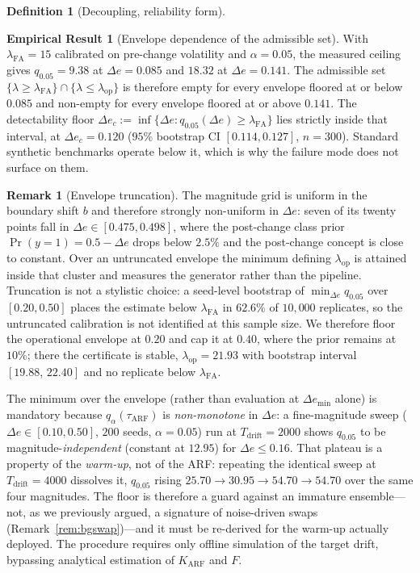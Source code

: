 \documentclass[10pt,conference]{IEEEtran}
\theoremstyle{definition}
\newtheorem{definition}[theorem]{Definition}
\newtheorem{remark}[theorem]{Remark}
\newtheorem{empresult}{Empirical Result}
\newcommand{\LambdaFA}{15}                   %
\newcommand{\LambdaOpNarrow}{21.93}          %
\newcommand{\LambdaOpNarrowCI}{[19.88,\,22.40]}
\newcommand{\WideEnvUnstable}{62.6}          %
\newcommand{\EnvLo}{0.20}\newcommand{\EnvHi}{0.40}
\newcommand{\DeFloorLo}{0.085}\newcommand{\DeFloorHi}{0.141}
\newcommand{\QlowFloorLo}{9.38}\newcommand{\QlowFloorHi}{18.32}
\newcommand{\DeCrit}{0.120}                  %
\newcommand{\DeCritCI}{[0.114, 0.127]}       %
\begin{document}
\begin{definition}[Decoupling, reliability form]
\begin{empresult}[Envelope dependence of the admissible set]\label{res:tension}
  With $\lambda_{\mathrm{FA}} = \LambdaFA$ calibrated on pre-change volatility and $\alpha = 0.05$, the measured ceiling gives $q_{0.05} = \QlowFloorLo$ at $\Delta e = \DeFloorLo$ and $\QlowFloorHi$ at $\Delta e = \DeFloorHi$. The admissible set $\{\lambda \ge \lambda_{\mathrm{FA}}\} \cap \{\lambda \le \lambda_{\mathrm{op}}\}$ is therefore empty for every envelope floored at or below $\DeFloorLo$ and non-empty for every envelope floored at or above $\DeFloorHi$. The detectability floor $\Delta e_c := \inf\{\Delta e : q_{0.05}(\Delta e) \ge \lambda_{\mathrm{FA}}\}$ lies strictly inside that interval, at $\Delta e_c = \DeCrit$ ($95\%$ bootstrap CI $\DeCritCI$, $n=300$). Standard synthetic benchmarks operate below it, which is why the failure mode does not surface on them.
\end{empresult}

\begin{remark}[Envelope truncation]\label{rem:envelope}
  The magnitude grid is uniform in the boundary shift $b$ and therefore strongly non-uniform in $\Delta e$: seven of its twenty points fall in $\Delta e \in [0.475, 0.498]$, where the post-change class prior $\Pr(y=1) = 0.5 - \Delta e$ drops below $2.5\%$ and the post-change concept is close to constant. Over an untruncated envelope the minimum defining $\lambda_{\mathrm{op}}$ is attained inside that cluster and measures the generator rather than the pipeline. Truncation is not a stylistic choice: a seed-level bootstrap of $\min_{\Delta e} q_{0.05}$ over $[\EnvLo, 0.50]$ places the estimate below $\lambda_{\mathrm{FA}}$ in $\WideEnvUnstable\%$ of $10{,}000$ replicates, so the untruncated calibration is not identified at this sample size. We therefore floor the operational envelope at $\EnvLo$ and cap it at $\EnvHi$, where the prior remains at $10\%$; there the certificate is stable, $\lambda_{\mathrm{op}} = \LambdaOpNarrow$ with bootstrap interval $\LambdaOpNarrowCI$ and no replicate below $\lambda_{\mathrm{FA}}$.
\end{remark}

  The minimum over the envelope (rather than evaluation at $\Delta e_{\min}$ alone) is mandatory because $q_{\alpha}(\tau_{\mathrm{ARF}})$ is \emph{non-monotone} in $\Delta e$: a fine-magnitude sweep ($\Delta e \in [0.10,0.50]$, $200$ seeds, $\alpha = 0.05$) run at $T_{\mathrm{drift}} = 2000$ shows $q_{0.05}$ to be magnitude-\emph{independent} (constant at $12.95$) for $\Delta e \le 0.16$. That plateau is a property of the \emph{warm-up}, not of the ARF: repeating the identical sweep at $T_{\mathrm{drift}} = 4000$ dissolves it, $q_{0.05}$ rising $25.70 \to 30.95 \to 54.70 \to 54.70$ over the same four magnitudes. The floor is therefore a guard against an immature ensemble---not, as we previously argued, a signature of noise-driven swaps (Remark~\ref{rem:bgswap})---and it must be re-derived for the warm-up actually deployed. The procedure requires only offline simulation of the target drift, bypassing analytical estimation of $K_{\mathrm{ARF}}$ and $F$.
\end{definition}
\end{document}
